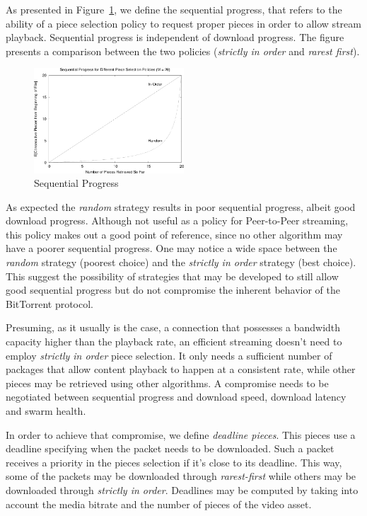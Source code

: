 As presented in Figure~\ref{fig:multimedia-dist:sequential-progress}, we
define the sequential progress, that refers to the ability of a piece
selection policy to request proper pieces in order to allow stream playback.
Sequential progress is independent of download progress. The figure presents a
comparison between the two policies (\textit{strictly in order} and
\textit{rarest first}).

\begin{figure}
  \centering
  \includegraphics[width=0.5\textwidth]{src/img/multimedia-dist/sequential-progress}
  \caption{Sequential Progress~\cite{bt-analysis-on-demand}}
  \label{fig:multimedia-dist:sequential-progress}
\end{figure}

As expected the \textit{random} strategy results in poor sequential progress,
albeit good download progress. Although not useful as a policy for
Peer-to-Peer streaming, this policy makes out a good point of reference, since
no other algorithm may have a poorer sequential progress. One may notice a
wide space between the \textit{random} strategy (poorest choice) and the
\textit{strictly in order} strategy (best choice). This suggest the
possibility of strategies that may be developed to still allow good
sequential progress but do not compromise the inherent behavior of the
BitTorrent protocol.

Presuming, as it usually is the case, a connection that possesses a bandwidth
capacity higher than the playback rate, an efficient streaming doesn't need to
employ \textit{strictly in order} piece selection. It only needs a sufficient
number of packages that allow content playback to happen at a consistent rate,
while other pieces may be retrieved using other algorithms. A compromise needs
to be negotiated between sequential progress and download speed, download
latency and swarm health.

In order to achieve that compromise, we define \textit{deadline pieces}. This
pieces use a deadline specifying when the packet needs to be downloaded. Such
a packet receives a priority in the pieces selection if it's close to its
deadline. This way, some of the packets may be downloaded through
\textit{rarest-first} while others may be downloaded through \textit{strictly
in order}. Deadlines may be computed by taking into account the media bitrate
and the number of pieces of the video asset.

